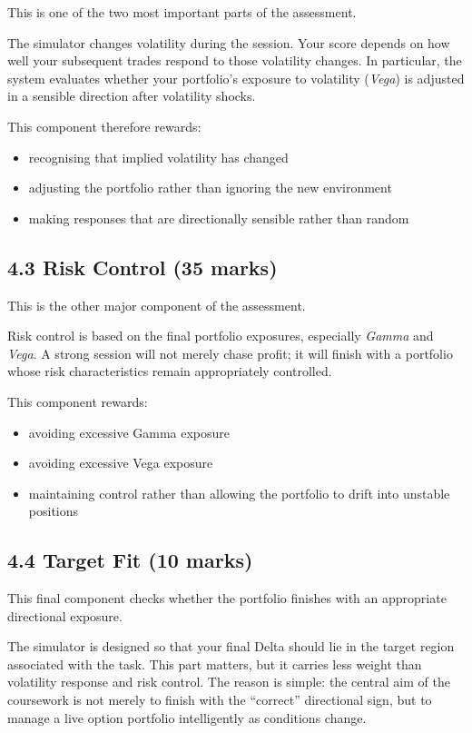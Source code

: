 \documentclass[11pt,a4paper]{article}
\begin{document}
This is one of the two most important parts of the assessment.

The simulator changes volatility during the session. Your score depends on how well your subsequent trades respond to those volatility changes. In particular, the system evaluates whether your portfolio's exposure to volatility (\textit{Vega}) is adjusted in a sensible direction after volatility shocks.

This component therefore rewards:
\begin{itemize}[leftmargin=1.5em]
\item recognising that implied volatility has changed
\item adjusting the portfolio rather than ignoring the new environment
\item making responses that are directionally sensible rather than random
\end{itemize}

\subsection*{4.3 Risk Control (35 marks)}

This is the other major component of the assessment.

Risk control is based on the final portfolio exposures, especially \textit{Gamma} and \textit{Vega}. A strong session will not merely chase profit; it will finish with a portfolio whose risk characteristics remain appropriately controlled.

This component rewards:
\begin{itemize}[leftmargin=1.5em]
\item avoiding excessive Gamma exposure
\item avoiding excessive Vega exposure
\item maintaining control rather than allowing the portfolio to drift into unstable positions
\end{itemize}

\subsection*{4.4 Target Fit (10 marks)}

This final component checks whether the portfolio finishes with an appropriate directional exposure.

The simulator is designed so that your final Delta should lie in the target region associated with the task. This part matters, but it carries less weight than volatility response and risk control. The reason is simple: the central aim of the coursework is not merely to finish with the ``correct'' directional sign, but to manage a live option portfolio intelligently as conditions change.
\end{document}
